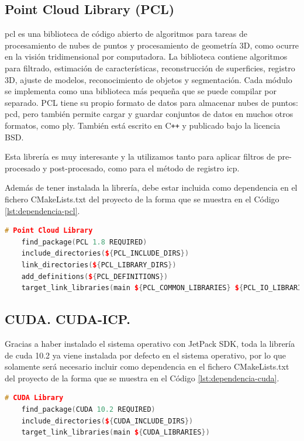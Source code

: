 \subsection{Point Cloud Library (PCL)}

\gls{pcl} es una biblioteca de código abierto de algoritmos para tareas de procesamiento de nubes de puntos y procesamiento de geometría 3D, como ocurre en la visión tridimensional por computadora.
La biblioteca contiene algoritmos para filtrado, estimación de características, reconstrucción de superficies, registro 3D, ajuste de modelos, reconocimiento de objetos y segmentación.
Cada módulo se implementa como una biblioteca más pequeña que se puede compilar por separado.
PCL tiene su propio formato de datos para almacenar nubes de puntos: \gls{pcd}, pero también permite cargar y guardar conjuntos de datos en muchos otros formatos, como \gls{ply}.
También está escrito en C\texttt{++} y publicado bajo la licencia BSD.

Esta librería es muy interesante y la utilizamos tanto para aplicar filtros de pre-procesado y post-procesado, como para el método de registro \gls{icp}.

Además de tener instalada la librería, debe estar incluida como dependencia en el fichero CMakeLists.txt del proyecto de la forma que se muestra en el Código \ref{lst:dependencia-pcl}.

\begin{lstlisting}[language={C++}, caption={Dependencia CMakeLists: Point Cloud Library}, label={lst:dependencia-pcl}]
    # Point Cloud Library
    find_package(PCL 1.8 REQUIRED)
    include_directories(${PCL_INCLUDE_DIRS})
    link_directories(${PCL_LIBRARY_DIRS})
    add_definitions(${PCL_DEFINITIONS})
    target_link_libraries(main ${PCL_COMMON_LIBRARIES} ${PCL_IO_LIBRARIES} ${PCL_FILTERS_LIBRARIES})
\end{lstlisting}

\subsection{CUDA. CUDA-ICP.}

Gracias a haber instalado el sistema operativo con JetPack SDK, toda la librería de \gls{cuda} 10.2 ya viene instalada por defecto en el sistema operativo, por lo que solamente será necesario incluir como dependencia en el fichero CMakeLists.txt del proyecto de la forma que se muestra en el Código \ref{lst:dependencia-cuda}.

\begin{lstlisting}[language={C++}, caption={Dependencia CMakeLists: CUDA}, label={lst:dependencia-cuda}]
    # CUDA Library
    find_package(CUDA 10.2 REQUIRED)
    include_directories(${CUDA_INCLUDE_DIRS})
    target_link_libraries(main ${CUDA_LIBRARIES})
\end{lstlisting}

